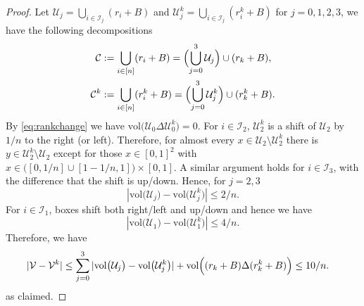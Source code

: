 \documentclass[11pt]{article}
\newtheorem{defn}{Definition}
\newcommand{\vol}{\mathrm{vol}}
\newcommand{\abs}[1]{| #1|}
\begin{document}
\begin{proof}
Let $\mathcal{U}_j = \bigcup_{i \in \mathcal{I}_j}(r_i + B)$ and $\mathcal{U}_j^k = \bigcup_{i \in \mathcal{I}_j}(r_i^k + B)$ for $j = 0, 1, 2, 3$, we have the following decompositions
\begin{align*}
\mathcal{C}&:=\bigcup_{i \in [n]} (r_i + B) = \Bigl(\bigcup_{j = 0}^3 \mathcal{U}_j\Bigr) \cup (r_k + B), \\ 
\mathcal{C}^k&:=\bigcup_{i \in [n]} (r_i^k + B) = \Bigl(\bigcup_{j = 0}^3 \mathcal{U}_j^{k}\Bigr) \cup (r_k^k + B).
\end{align*}
By \eqref{eq:rankchange} we have $\vol\bigl(\mathcal{U}_0 \Delta \mathcal{U}_0^k\bigr) = 0$. For $i\in\mathcal{I}_2$, $\mathcal{U}_2^k$ is a shift of $\mathcal{U}_2$ by $1/n$ to the right (or left). Therefore, for almost every $x\in \mathcal{U}_2\setminus \mathcal{U}_2^k$ there is $y\in \mathcal{U}_2^k\setminus \mathcal{U}_2$ except for those $x\in[0, 1]^2$ with $x\in\big([0, 1/n]\cup[1-1/n, 1]\big)\times[0, 1]$. A similar argument holds for $i\in\mathcal{I}_3$, with the difference that the shift is up/down. Hence, for $j = 2, 3$
\[
\abs{\vol\big(\mathcal{U}_j\big) - \vol\big(\mathcal{U}_j^k\big)} \leq 2/n.
\]
For $i\in\mathcal{I}_1$, boxes shift both right/left and up/down and hence we have
\[
\abs{\vol\big(\mathcal{U}_1\big) - \vol\big(\mathcal{U}_1^k\big)} \leq 4/n.
\]
Therefore, we have
\begin{align*}
    \abs{\mathcal{V} - \mathcal{V}^k} &\leq \sum_{j = 0}^3 \abs{\vol\bigl(\mathcal{U}_j\bigr) - \vol\bigl(\mathcal{U}_j^k\bigr)} + \vol\Bigl((r_k + B)\Delta (r_k^{k} + B)\Bigr) \leq 10/n.
\end{align*}
as claimed.
\end{proof}

\end{document}
